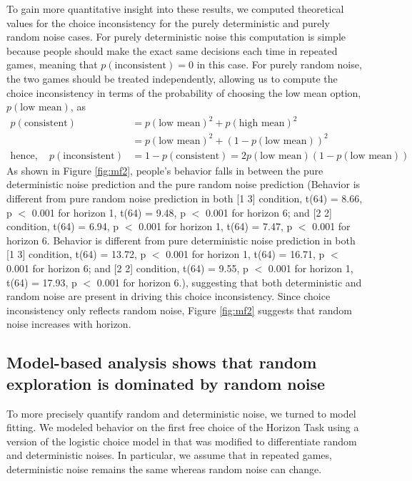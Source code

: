\documentclass[12pt]{article}
\begin{document}
	To gain more quantitative insight into these results, we computed theoretical values for the choice inconsistency for the purely deterministic and purely random noise cases.  For purely deterministic noise this computation is simple because people should make the exact same decisions each time in repeated games, meaning that $p(\mbox{inconsistent}) = 0$ in this case. For purely random noise, the two games should be treated independently, allowing us to compute the choice inconsistency in terms of the probability of choosing the low mean option, $p(\mbox{low mean})$, as
	\begin{equation*}
	\begin{split}
	p(\mbox{consistent}) &= p(\mbox{low mean})^2 + p(\mbox{high mean})^2\\
	&= p(\mbox{low mean})^2 + (1-p(\mbox{low mean}))^2\\ 
	\mbox{hence},\quad p(\mbox{inconsistent}) &=  
	1 - p(\mbox{consistent}) = 
	2 p(\mbox{low mean})(1-p(\mbox{low mean}))
	\end{split}
	\end{equation*}
	As shown in Figure  \ref{fig:mf2}, people's behavior falls in between the pure deterministic noise prediction and the pure random noise prediction (Behavior is different from pure random noise prediction in both [1 3] condition, t(64) = 8.66, p $<$ 0.001 for horizon 1, t(64) = 9.48, p $<$ 0.001 for horizon 6; and [2 2] condition, t(64) = 6.94, p $<$ 0.001 for horizon 1, t(64) = 7.47, p $<$ 0.001 for horizon 6. Behavior is different from pure deterministic noise prediction in both [1 3] condition, t(64) = 13.72, p $<$ 0.001 for horizon 1, t(64) = 16.71, p $<$ 0.001 for horizon 6; and [2 2] condition, t(64) = 9.55, p $<$ 0.001 for horizon 1, t(64) = 17.93, p $<$ 0.001 for horizon 6.), suggesting that both deterministic and random noise are present in driving this choice inconsistency. Since choice inconsistency only reflects random noise, Figure \ref{fig:mf2} suggests that random noise increases with horizon.
	
	\subsection*{Model-based analysis shows that random exploration is dominated by random noise}
	
	To more precisely quantify random and deterministic noise, we turned to model fitting. We modeled behavior on the first free choice of the Horizon Task using a version of the logistic choice model in \citep{wilson2014} that was modified to differentiate random and deterministic noises. In particular, we assume that in repeated games, deterministic noise remains the same whereas random noise can change. 
	
\end{document}
